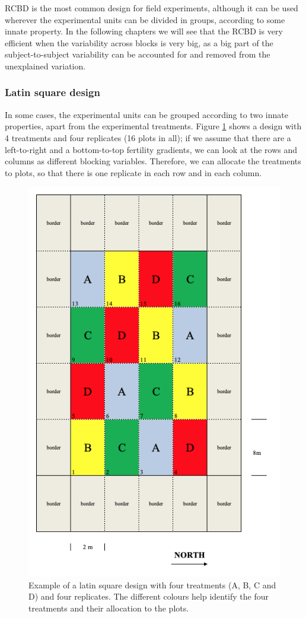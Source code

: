 \documentclass[a4paper,12pt,oneside]{book}
\begin{document}
RCBD is the most common design for field experiments, although it can be used wherever the experimental units can be divided in groups, according to some innate property. In the following chapters we will see that the RCBD is very efficient when the variability across blocks is very big, as a big part of the subject-to-subject variability can be accounted for and removed from the unexplained variation.

\hypertarget{latin-square-design}{%
\subsubsection{Latin square design}\label{latin-square-design}}

In some cases, the experimental units can be grouped according to two innate properties, apart from the experimental treatments. Figure \ref{fig:figName35} shows a design with 4 treatments and four replicates (16 plots in all); if we assume that there are a left-to-right and a bottom-to-top fertility gradients, we can look at the rows and columns as different blocking variables. Therefore, we can allocate the treatments to plots, so that there is one replicate in each row and in each column.

\begin{figure}

{\centering \includegraphics[width=0.7\linewidth]{_images/Mappa2LS} 

}

\caption{Example of a latin square design with four treatments (A, B, C and D) and four replicates. The different colours help identify the four treatments and their allocation to the plots.}\label{fig:figName35}
\end{figure}
\end{document}

